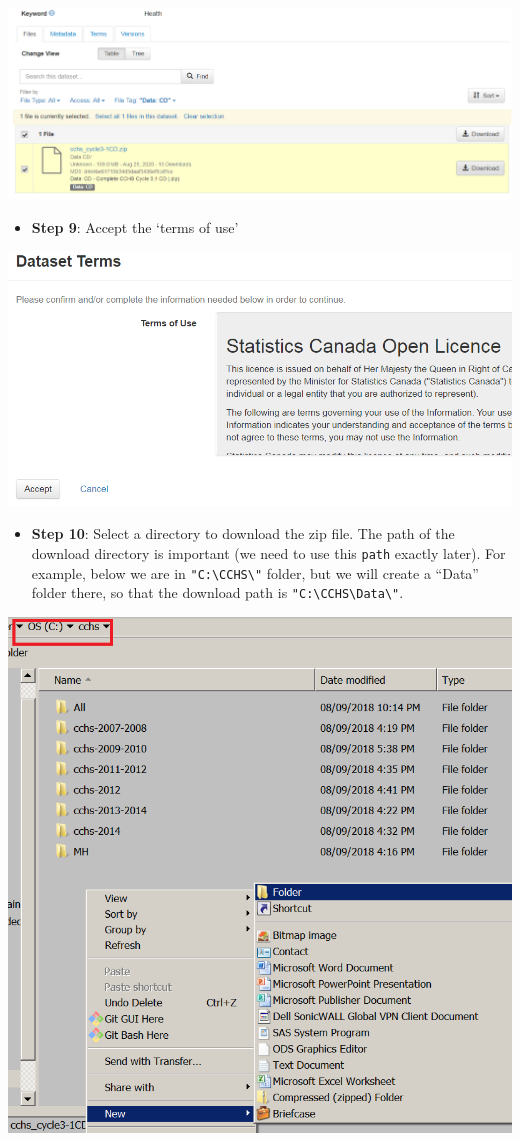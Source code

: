 \documentclass[
]{book}
\providecommand{\tightlist}{%
  \setlength{\itemsep}{0pt}\setlength{\parskip}{0pt}}
\begin{document}
\includegraphics[width=0.65\linewidth]{images/abacusX8}

\begin{itemize}
\tightlist
\item
  \textbf{Step 9}: Accept the `terms of use'
\end{itemize}

\includegraphics[width=0.65\linewidth]{images/abacusX9}

\begin{itemize}
\tightlist
\item
  \textbf{Step 10}: Select a directory to download the zip file. The path of the download directory is important (we need to use this \texttt{path} exactly later). For example, below we are in \texttt{"C:\textbackslash{}CCHS\textbackslash{}"} folder, but we will create a ``Data'' folder there, so that the download path is \texttt{"C:\textbackslash{}CCHS\textbackslash{}Data\textbackslash{}"}.
\end{itemize}

\includegraphics[width=0.65\linewidth]{images/abacusX10}
\end{document}

